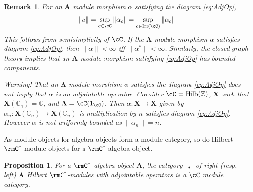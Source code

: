 \documentclass[11pt,reqno]{amsart}
\DeclareMathOperator{\Irr}{Irr}
\DeclareMathOperator{\Hilb}{Hilb}
\DeclareMathOperator{\CMod}{C^*Mod}
\newcommand{\bb}[1]{\mathbf{#1}}
\numberwithin{equation}{section}
\theoremstyle{plain}
\newtheorem{prop}[thm]{Proposition}
\newtheorem{rmk}[thm]{Remark}
\begin{document}
\begin{rmk}
For an $\bb A$ module morphism $\alpha$ satisfying the diagram \ref{eq:AdjOp}, $$\|a\| = \sup \limits_{c \in \cC} \|\alpha_c\| = \sup \limits_{c \in \Irr(\cC)} \|\alpha_c\|$$
This follows from semisimplicity of $\cC$.
If the $\bb A$ module morphism $\alpha$ satisfies diagram \ref{eq:AdjOp}, then $\|\alpha\| < \infty$ iff $\|\alpha^*\| < \infty$.
Similarly, the closed graph theory implies that an $\bb A$ module morphism satisfying \ref{eq:AdjOp} has bounded components.

Warning!
That an $\bb A$ module morphism $\alpha$ satisfies the diagram \ref{eq:AdjOp} does not imply that $\alpha$ is an adjointable operator.
Consider $\cC = \Hilb(\mathbb Z)$, $\bb X$ such that $\bb X (\mathbb{C}_n) = \mathbb{C}$, and $\bb A = \cC(1_\cC)$.
Then $\alpha \colon \bb X \to \bb X$ given by $\alpha_n \colon \bb X(\mathbb{C}_n) \to \bb X(\mathbb{C}_n)$ is multiplication by $n$ satisfies diagram \ref{eq:AdjOp}.
However $\alpha$ is not uniformly bounded as $\|\alpha_n\| = n$.
\end{rmk}

As module objects for algebra objects form a module category, so do Hilbert $\rmC^*$ module objects for a $\rmC^*$ algebra object.

\begin{prop} \label{prop:modulecat}
For a $\rmC^*$-algebra object $\bb A$, the category $\CMod_{\bb A}$ of right (resp. left) $\bb A$ Hilbert $\rmC^*$-modules with adjointable operators is a $\cC$ module category.
\end{prop}
\end{document}
